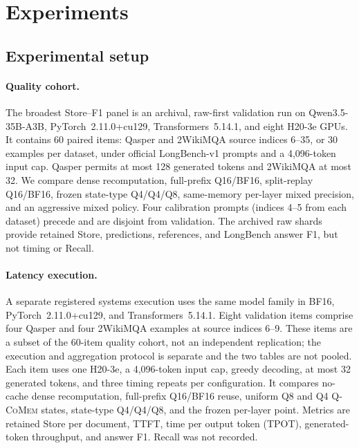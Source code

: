 \documentclass{article}
\newcommand{\qcomem}{\textsc{Q-CoMem}}
\begin{document}
\section{Experiments}
\label{sec:experiments}
\label{sec:protocol}

\subsection{Experimental setup}

\paragraph{Quality cohort.}
The broadest Store--F1 panel is an archival, raw-first validation run on
Qwen3.5-35B-A3B, PyTorch~2.11.0+cu129, Transformers~5.14.1, and eight H20-3e
GPUs.  It contains 60 paired items: Qasper and 2WikiMQA source indices 6--35,
or 30 examples per dataset, under official LongBench-v1 prompts and a
4,096-token input cap.  Qasper permits at most 128 generated tokens and
2WikiMQA at most 32.  We compare dense recomputation, full-prefix Q16/BF16,
split-replay Q16/BF16, frozen state-type Q4/Q4/Q8, same-memory per-layer mixed
precision, and an aggressive mixed policy.  Four calibration prompts (indices
4--5 from each dataset) precede and are disjoint from validation.  The archived
raw shards provide retained Store, predictions, references, and LongBench
answer F1, but not timing or Recall.

\paragraph{Latency execution.}
A separate registered systems execution uses the same model family in BF16,
PyTorch~2.11.0+cu129, and Transformers~5.14.1.  Eight validation items comprise
four Qasper and four 2WikiMQA examples at source indices 6--9.  These items are
a subset of the 60-item quality cohort, not an independent replication; the
execution and aggregation protocol is separate and the two tables are not
pooled.  Each item uses one H20-3e, a 4,096-token input cap, greedy decoding, at
most 32 generated tokens, and three timing repeats per configuration.  It
compares no-cache dense recomputation,
full-prefix Q16/BF16 reuse, uniform Q8 and Q4 \qcomem{} states, state-type
Q4/Q4/Q8, and the frozen per-layer point.  Metrics are retained Store per
document, TTFT, time per output token (TPOT), generated-token throughput, and
answer F1.  Recall was not recorded.
\end{document}
